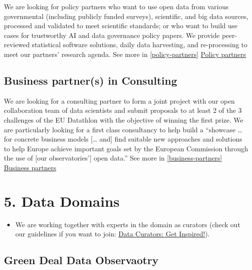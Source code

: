 \documentclass[
  a4paper,
  openany, a4paper, oneside]{book}
\providecommand{\tightlist}{%
  \setlength{\itemsep}{0pt}\setlength{\parskip}{0pt}}
\begin{document}
We are looking for policy partners who want to use open data from various governmental (including publicly funded surveys), scientific, and big data sources, processed and validated to meet scientific standards; or who want to build use cases for trustworthy AI and data governance policy papers. We provide peer-reviewed statistical software solutions, daily data harvesting, and re-processing to meet our partners' research agenda. See more in \ref{policy-partners} \protect\hyperlink{policy-partners}{Policy partners}

\hypertarget{intro-business-partners}{%
\subsection*{Business partner(s) in Consulting}\label{intro-business-partners}}

We are looking for a consulting partner to form a joint project with our open collaboration team of data scientists and submit proposals to at least 2 of the 3 challenges of the EU Datathlon with the objective of winning the first prize. We are particularly looking for a first class consultancy to help build a ``showcase \ldots{} for concrete business models {[}\ldots{} and{]} find suitable new approaches and solutions to help Europe achieve important goals set by the European Commission through the use of {[}our observatories'{]} open data.'' See more in \ref{business-partners} \protect\hyperlink{business-partners}{Business partners}

\hypertarget{data-domains}{%
\section*{5. Data Domains}\label{data-domains}}

\begin{itemize}
\tightlist
\item
  We are working together with experts in the domain as curators (check out our guidelines if you want to join: \href{https://curators.dataobservatory.eu/data-curators.html}{Data Curators: Get Inspired!}).
\end{itemize}

\hypertarget{green-deal-data-observaotry}{%
\subsection*{Green Deal Data Observaotry}\label{green-deal-data-observaotry}}
\end{document}
